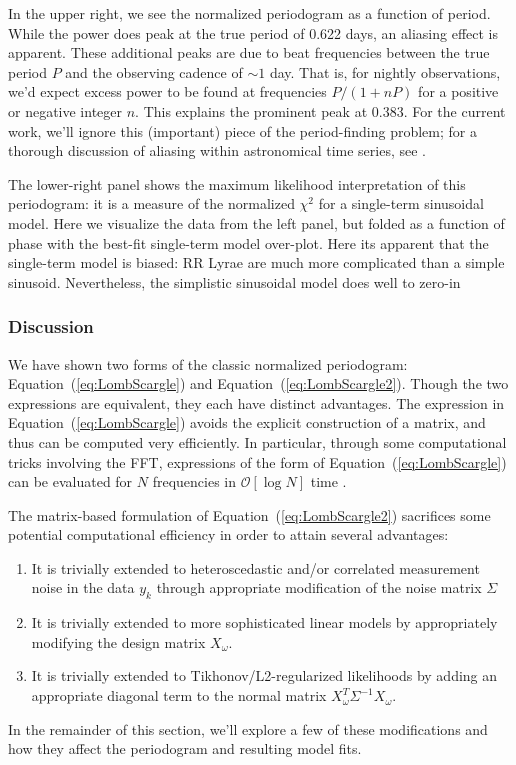 \documentclass[12pt,preprint]{aastex}
\newcommand{\Eq}[1]{Equation~(\ref{eq:#1})}
\newcommand{\eq}[1]{\Eq{#1}}
\begin{document}
In the upper right, we see the normalized periodogram as a function of period. While the power does peak at the true period of 0.622 days, an aliasing effect is apparent. These additional peaks are due to beat frequencies between the true period $P$ and the observing cadence of $\sim 1$ day. That is, for nightly observations, we'd expect excess power to be found at frequencies $P / (1 + nP)$ for a positive or negative integer $n$. This explains the prominent peak at $0.383$. For the current work, we'll ignore this (important) piece of the period-finding problem; for a thorough discussion of aliasing within astronomical time series, see \citet{Roberts87}.

The lower-right panel shows the maximum likelihood interpretation of this periodogram: it is a measure of the normalized $\chi^2$ for a single-term sinusoidal model. Here we visualize the data from the left panel, but folded as a function of phase with the best-fit single-term model over-plot. Here its apparent that the single-term model is biased: RR Lyrae are much more complicated than a simple sinusoid. Nevertheless, the simplistic sinusoidal model does well to zero-in

\subsubsection{Discussion}
We have shown two forms of the classic normalized periodogram: \eq{LombScargle} and \eq{LombScargle2}. Though the two expressions are equivalent, they each have distinct advantages. The expression in \eq{LombScargle} avoids the explicit construction of a matrix, and thus can be computed very efficiently. In particular, through some computational tricks involving the FFT, expressions of the form of \eq{LombScargle} can be evaluated for $N$ frequencies in $\mathcal{O}[\log{N}]$ time \citep{Press89}.

The matrix-based formulation of \eq{LombScargle2} sacrifices some potential computational efficiency in order to attain several advantages:
\begin{enumerate}
  \item It is trivially extended to heteroscedastic and/or correlated measurement noise in the data $y_k$ through appropriate modification of the noise matrix $\Sigma$
  \item It is trivially extended to more sophisticated linear models by appropriately modifying the design matrix $X_\omega$.
  \item It is trivially extended to Tikhonov/L2-regularized likelihoods by adding an appropriate diagonal term to the normal matrix $X_\omega^T\Sigma^{-1}X_\omega$.
\end{enumerate}
In the remainder of this section, we'll explore a few of these modifications and how they affect the periodogram and resulting model fits.
\end{document}
